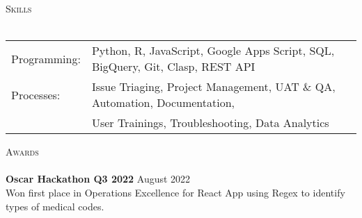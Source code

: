 \documentclass[a4paper]{article}
\newcommand{\lineunder} {
    \vspace*{-8pt} \\
    \hspace*{-18pt} \hrulefill \\
}
\newcommand{\header} [1] {
    {\hspace*{-18pt}\vspace*{6pt} \textsc{#1}}
    \vspace*{-6pt} \lineunder
}
\begin{document}
\header{Skills}
\begin{tabular}{ l l }
	Programming:    &   Python, R, JavaScript, Google Apps Script, SQL, BigQuery, Git, Clasp, REST API\\
    Processes:      &   Issue Triaging, Project Management, UAT \& QA, Automation, Documentation,\\ 
                    &   User Trainings, Troubleshooting,  Data Analytics
\end{tabular}
\vspace{2mm}


\header{Awards}
\textbf{Oscar Hackathon Q3 2022} \hfill August 2022\\
Won first place in Operations Excellence for React App using Regex to identify types of medical codes. 
\vspace*{2mm}

\ 
\end{document}
